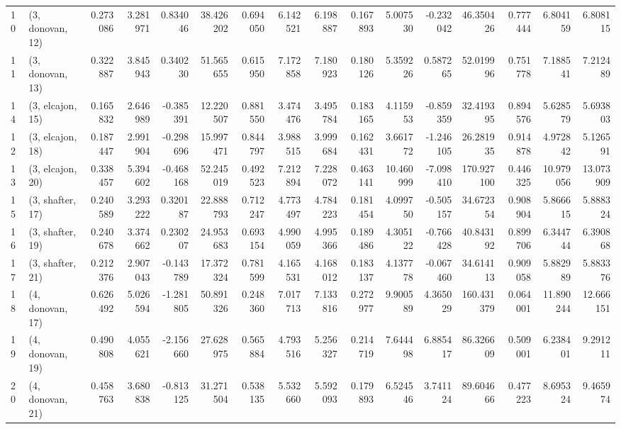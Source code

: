 \begin{tabular}{llrrrrrrrrrrrrrr}
10 &  (3, donovan, 12) &   0.273086 &  3.281971 &  0.834046 &  38.426202 &  0.694050 &   6.142521 &  6.198887 &  0.167893 &   5.007530 & -0.232042 &   46.350426 &  0.777444 &   6.804159 &   6.808115 \\
11 &  (3, donovan, 13) &   0.322887 &  3.845943 &  0.340230 &  51.565655 &  0.615950 &   7.172858 &  7.180923 &  0.180126 &   5.359226 &  0.587265 &   52.019996 &  0.751778 &   7.188541 &   7.212489 \\
14 &  (3, elcajon, 15) &   0.165832 &  2.646989 & -0.385391 &  12.220507 &  0.881550 &   3.474476 &  3.495784 &  0.183165 &   4.115953 & -0.859359 &   32.419395 &  0.894576 &   5.628579 &   5.693803 \\
12 &  (3, elcajon, 18) &   0.187447 &  2.991904 & -0.298696 &  15.997471 &  0.844797 &   3.988515 &  3.999684 &  0.162431 &   3.661772 & -1.246105 &   26.281935 &  0.914878 &   4.972842 &   5.126591 \\
13 &  (3, elcajon, 20) &   0.338457 &  5.394602 & -0.468168 &  52.245019 &  0.492523 &   7.212894 &  7.228072 &  0.463141 &  10.460999 & -7.098410 &  170.927100 &  0.446325 &  10.979056 &  13.073909 \\
15 &  (3, shafter, 17) &   0.240589 &  3.293222 &  0.320187 &  22.888793 &  0.712247 &   4.773497 &  4.784223 &  0.181454 &   4.099750 & -0.505157 &   34.672354 &  0.908904 &   5.866615 &   5.888324 \\
16 &  (3, shafter, 19) &   0.240678 &  3.374662 &  0.230207 &  24.953683 &  0.693154 &   4.990059 &  4.995366 &  0.189486 &   4.305122 & -0.766428 &   40.843192 &  0.899706 &   6.344744 &   6.390868 \\
17 &  (3, shafter, 21) &   0.212376 &  2.907043 & -0.143789 &  17.372324 &  0.781599 &   4.165531 &  4.168012 &  0.183137 &   4.137778 & -0.067460 &   34.614113 &  0.909058 &   5.882989 &   5.883376 \\
18 &  (4, donovan, 17) &   0.626492 &  5.026594 & -1.281805 &  50.891326 &  0.248360 &   7.017713 &  7.133816 &  0.272977 &   9.900589 &  4.365029 &  160.431379 &  0.064001 &  11.890244 &  12.666151 \\
19 &  (4, donovan, 19) &   0.490808 &  4.055621 & -2.156660 &  27.628975 &  0.565884 &   4.793516 &  5.256327 &  0.214719 &   7.644498 &  6.885417 &   86.326609 &  0.509001 &   6.238401 &   9.291211 \\
20 &  (4, donovan, 21) &   0.458763 &  3.680838 & -0.813125 &  31.271504 &  0.538135 &   5.532660 &  5.592093 &  0.179893 &   6.524546 &  3.741124 &   89.604666 &  0.477223 &   8.695324 &   9.465974 \\

\end{tabular}
